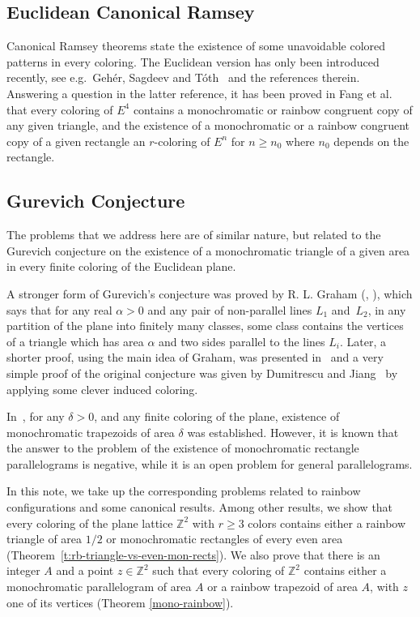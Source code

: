 \documentclass[a4paper, 11pt,reqno]{amsart}
\theoremstyle{definition}
\newcommand{\Z}{\mbox{${\mathbb Z}$}}
\begin{document}
{\subsection{Euclidean Canonical Ramsey} Canonical Ramsey theorems state the existence of some unavoidable
colored patterns  in every coloring. The Euclidean version has only been introduced recently,
see e.g.~Geh\'er,  Sagdeev and T\'oth~\cite{GST2025} and the references therein. Answering a question
in the latter  reference, it has been proved in Fang et al.~\cite{FGSXXY} that every coloring of $E^4$
contains a monochromatic or rainbow congruent copy of any given triangle, and  the existence of a
monochromatic or a rainbow congruent copy of a given rectangle
an $r$-coloring of $E^n$ for $n\geq n_0$ where $n_0$ depends on the rectangle.

\subsection{Gurevich Conjecture}
The problems that we address here are of similar nature, but related to the Gurevich conjecture on
the existence of a monochromatic triangle of a given area in {every finite coloring of the Euclidean plane}.
}

A stronger form of Gurevich's conjecture
was proved by R. L. Graham (\cite{gra2}, \cite{gra1}), which says that
 for any {real}  $\alpha >0$ and any pair of non-parallel
lines $L_1$ and~$L_2$, in any partition of the plane into finitely many
classes, some class contains the vertices of a triangle which has area
$\alpha$ and two sides parallel to the lines $L_i$. Later, a shorter proof, using the main idea of Graham,
was presented in~\cite{ad} and a very simple proof of the original conjecture was given by Dumitrescu and
Jiang~\cite{Jiang} by applying some clever induced coloring.

In~\cite{AC},  for any $\delta >0$, and any finite coloring of the plane,
existence of monochromatic trapezoids of area $\delta$ was established. However, it is known that the
answer to the
problem of the existence of monochromatic rectangle parallelograms is negative, while it is an open problem
for
general parallelograms.





In this note, we take up the corresponding problems related to  rainbow configurations and some canonical results. Among other results, we  show that every coloring of the plane lattice $\Z^2$ with $r\ge 3$ colors contains either a rainbow triangle of area $1/2$ or  monochromatic rectangles of every even area ({Theorem~\ref{t:rb-triangle-vs-even-mon-rects})}.
We also prove that there is an integer $A$ and a point $z\in \Z^2$ such that every coloring of $\Z^2$ contains  either a monochromatic parallelogram of area $A$
or a rainbow trapezoid of area $A$, with $z$ one of its vertices (Theorem \ref{mono-rainbow}).
\end{document}
